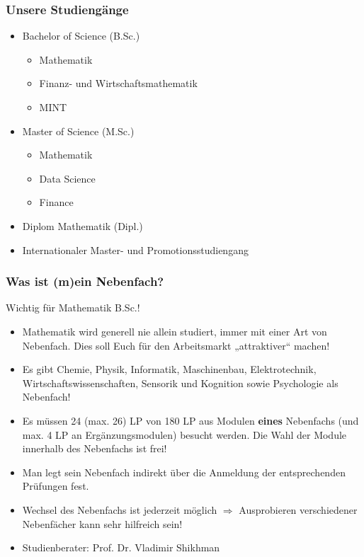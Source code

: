 \documentclass[10pt]{beamer}
\makeatletter
\newcommand{\highl}[1]{\color{tuccolor@ma}#1\color{black}}
\makeatother
\begin{document}
\begin{frame}
	\frametitle{Unsere Studiengänge}

	\begin{itemize}
		\item \highl{Bachelor of Science (B.Sc.)}
			\begin{itemize}
				\item \highl{Mathematik}
				\item \highl{Finanz- und Wirtschafts­mathematik}
				\item \highl{MINT}
			\end{itemize}
		\item Master of Science (M.Sc.)
			\begin{itemize}
				\item Mathematik
				\item Data Science
				\item Finance
			\end{itemize}
		\item \highl{Diplom Mathematik (Dipl.)}
		\item Internationaler Master- und Promotions­studiengang
	\end{itemize}
\end{frame}

\begin{frame}
	\frametitle{Was ist (m)ein Nebenfach?}

	\highl{Wichtig für Mathematik B.Sc.!}

	\begin{itemize}
		\item Mathematik wird generell nie allein studiert, immer mit einer Art von Nebenfach. Dies soll Euch für den Arbeitsmarkt „attraktiver“ machen!
		\item Es gibt Chemie, Physik, Informatik, Maschinenbau, Elektrotechnik, Wirtschaftswissenschaften, Sensorik und Kognition sowie Psychologie als Nebenfach!
		\item Es müssen 24 (max. 26) LP von 180 LP aus Modulen \textbf{eines} Nebenfachs (und max. 4 LP an Ergänzungsmodulen) besucht werden. Die Wahl der Module innerhalb des Nebenfachs ist frei!
		\item Man legt sein Nebenfach indirekt über die Anmeldung der entsprechenden Prüfungen fest.
		\item Wechsel des Nebenfachs ist jederzeit möglich $\Rightarrow$ Ausprobieren verschiedener Nebenfächer kann sehr hilfreich sein!
		\item Studienberater: Prof. Dr. Vladimir Shikhman
	\end{itemize}
\end{frame}
\end{document}
